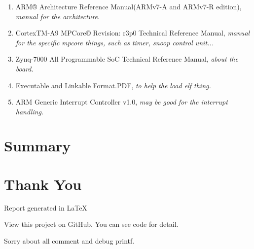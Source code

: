 \documentclass[12pt]{article}
\begin{document}
\begin{enumerate}
	\item	ARM® Architecture Reference Manual(ARMv7-A and ARMv7-R edition), \emph{manual for the architecture}.
	\item CortexTM-A9 MPCore® Revision: r3p0 Technical Reference Manual, \emph{manual for the specific mpcore things, such as timer, snoop control unit...}
	\item	Zynq-7000 All Programmable SoC Technical Reference Manual, \emph{about the board.}
	\item	Executable and Linkable Format.PDF, \emph{to help the load elf thing.}
	\item ARM Generic Interrupt Controller v1.0, \emph{may be good for the interrupt handling.}
\end{enumerate}

\section{Summary}

\section{Thank You}

\indent \indent Report generated in \LaTeX

View this project on GitHub. You can see code for detail.

Sorry about all comment and debug printf.

\begin{thebibliography}{99}
\bibitem \url{}
\end{thebibliography}
\end{document}
